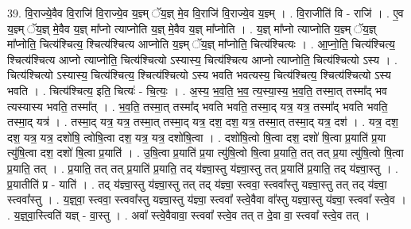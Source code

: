 \documentclass[17pt]{extarticle}
\begin{document}
39. वि॒राज्ये॒वैव वि॒राजि॑ वि॒राज्ये॒व य॒ज्ञ्म् ॅय॒ज्ञ् मे॒व वि॒राजि॑ वि॒राज्ये॒व य॒ज्ञ्म् । . वि॒राजीति॑ वि - राजि॑ । . ए॒व य॒ज्ञ्म् ॅय॒ज्ञ् मे॒वैव य॒ज्ञ् मा᳚प्नो त्याप्नोति य॒ज्ञ् मे॒वैव य॒ज्ञ् मा᳚प्नोति । . य॒ज्ञ् मा᳚प्नो त्याप्नोति य॒ज्ञ्म् ॅय॒ज्ञ् मा᳚प्नोति॒ चित्य॑श्चित्य॒ श्चित्य॑श्चित्य आप्नोति य॒ज्ञ्म् ॅय॒ज्ञ् मा᳚प्नोति॒ चित्य॑श्चित्यः । . आ॒प्नो॒ति॒ चित्य॑श्चित्य॒ श्चित्य॑श्चित्य आप्नो त्याप्नोति॒ चित्य॑श्चित्यो ऽस्यास्य॒ चित्य॑श्चित्य आप्नो त्याप्नोति॒ चित्य॑श्चित्यो ऽस्य । . चित्य॑श्चित्यो ऽस्यास्य॒ चित्य॑श्चित्य॒ श्चित्य॑श्चित्यो ऽस्य भवति भवत्यस्य॒ चित्य॑श्चित्य॒ श्चित्य॑श्चित्यो ऽस्य भवति । . चित्य॑श्चित्य॒ इति॒ चित्यः॑ - चि॒त्यः॒ । . अ॒स्य॒ भ॒व॒ति॒ भ॒व॒ त्य॒स्या॒स्य॒ भ॒व॒ति॒ तस्मा॒त् तस्मा᳚द् भव त्यस्यास्य भवति॒ तस्मा᳚त् । . भ॒व॒ति॒ तस्मा॒त् तस्मा᳚द् भवति भवति॒ तस्मा॒द् यत्र॒ यत्र॒ तस्मा᳚द् भवति भवति॒ तस्मा॒द् यत्र॑ । . तस्मा॒द् यत्र॒ यत्र॒ तस्मा॒त् तस्मा॒द् यत्र॒ दश॒ दश॒ यत्र॒ तस्मा॒त् तस्मा॒द् यत्र॒ दश॑ । . यत्र॒ दश॒ दश॒ यत्र॒ यत्र॒ दशो॑षि॒ त्वोषि॒त्वा दश॒ यत्र॒ यत्र॒ दशो॑षि॒त्वा । . दशो॑षि॒त्वो षि॒त्वा दश॒ दशो॑ षि॒त्वा प्र॒याति॑ प्र॒या त्यु॑षि॒त्वा दश॒ दशो॑ षि॒त्वा प्र॒याति॑ । . उ॒षि॒त्वा प्र॒याति॑ प्र॒या त्यु॑षि॒त्वो षि॒त्वा प्र॒याति॒ तत् तत् प्र॒या त्यु॑षि॒त्वो षि॒त्वा प्र॒याति॒ तत् । . प्र॒याति॒ तत् तत् प्र॒याति॑ प्र॒याति॒ तद् य॑ज्ञ्वा॒स्तु य॑ज्ञ्वा॒स्तु तत् प्र॒याति॑ प्र॒याति॒ तद् य॑ज्ञ्वा॒स्तु । . प्र॒यातीति॑ प्र - याति॑ । . तद् य॑ज्ञ्वा॒स्तु य॑ज्ञ्वा॒स्तु तत् तद् य॑ज्ञ्वा॒ स्त्ववा॒ स्त्ववा᳚स्तु यज्ञ्वा॒स्तु तत् तद् य॑ज्ञ्वा॒ स्त्ववा᳚स्तु । . य॒ज्ञ्॒वा॒ स्त्ववा॒ स्त्ववा᳚स्तु यज्ञ्वा॒स्तु य॑ज्ञ्वा॒ स्त्ववा᳚ स्त्वे॒वैवा वा᳚स्तु यज्ञ्वा॒स्तु य॑ज्ञ्वा॒ स्त्ववा᳚ स्त्वे॒व । . य॒ज्ञ्॒वा॒स्त्विति॑ यज्ञ् - वा॒स्तु । . अवा᳚ स्त्वे॒वैवावा॒ स्त्ववा᳚ स्त्वे॒व तत् त दे॒वा वा॒ स्त्ववा᳚ स्त्वे॒व तत् । \newline
\end{document}
